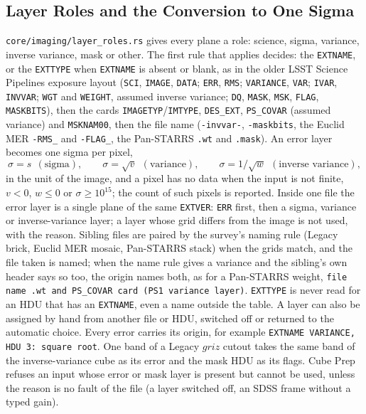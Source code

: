 \documentclass[11pt,a4paper]{article}
\newcommand{\code}[1]{\texttt{\small #1}}
\begin{document}
    \subsection{Layer Roles and the Conversion to One Sigma}
    \label{sec:layers}

    \code{core/imaging/layer\_roles.rs} gives every plane a role: science, sigma, variance, inverse variance, mask or other. The first rule that applies decides: the \code{EXTNAME}, or the \code{EXTTYPE} when \code{EXTNAME} is absent or blank, as in the older LSST Science Pipelines exposure layout (\code{SCI}, \code{IMAGE}, \code{DATA}; \code{ERR}, \code{RMS}; \code{VARIANCE}, \code{VAR}; \code{IVAR}, \code{INVVAR}; \code{WGT} and \code{WEIGHT}, assumed inverse variance; \code{DQ}, \code{MASK}, \code{MSK}, \code{FLAG}, \code{MASKBITS}), then the cards \code{IMAGETYP}/\code{IMTYPE}, \code{DES\_EXT}, \code{PS\_COVAR} (assumed variance) and \code{MSKNAM00}, then the file name (\code{-invvar-}, \code{-maskbits}, the Euclid MER \code{-RMS\_} and \code{-FLAG\_}, the Pan-STARRS \code{.wt} and \code{.mask}). An error layer becomes one sigma per pixel,
    \begin{equation}
        \sigma = s \ \ (\text{sigma}), \qquad \sigma = \sqrt{v} \ \ (\text{variance}), \qquad \sigma = 1/\sqrt{w} \ \ (\text{inverse variance}),
    \end{equation}
    in the unit of the image, and a pixel has no data when the input is not finite, $v < 0$, $w \le 0$ or $\sigma \ge 10^{15}$; the count of such pixels is reported. Inside one file the error layer is a single plane of the same \code{EXTVER}: \code{ERR} first, then a sigma, variance or inverse-variance layer; a layer whose grid differs from the image is not used, with the reason. Sibling files are paired by the survey's naming rule (Legacy brick, Euclid MER mosaic, Pan-STARRS stack) when the grids match, and the file taken is named; when the name rule gives a variance and the sibling's own header says so too, the origin names both, as for a Pan-STARRS weight, \code{file name .wt and PS\_COVAR card (PS1 variance layer)}. \code{EXTTYPE} is never read for an HDU that has an \code{EXTNAME}, even a name outside the table. A layer can also be assigned by hand from another file or HDU, switched off or returned to the automatic choice. Every error carries its origin, for example \code{EXTNAME VARIANCE, HDU 3: square root}. One band of a Legacy $griz$ cutout takes the same band of the inverse-variance cube as its error and the mask HDU as its flags. Cube Prep refuses an input whose error or mask layer is present but cannot be used, unless the reason is no fault of the file (a layer switched off, an SDSS frame without a typed gain).
\end{document}
